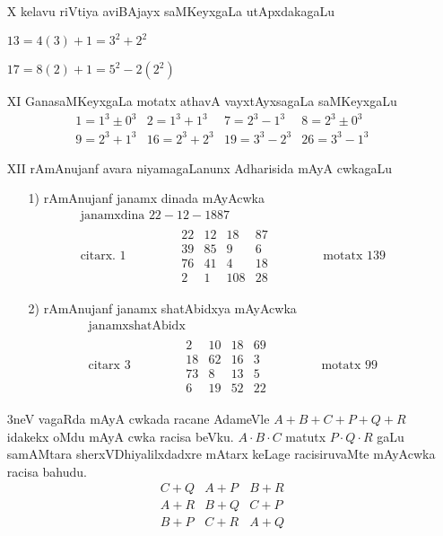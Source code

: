 \begin{enumerate}
\item[{\rm X}] kelavu riVtiya aviBAjayx saMKeyxgaLa utApxdakagaLu

$13=4(3)+1 = 3^{2}+2^{2}$

$17=8(2)+1 = 5^{2}-2(2^{2})$

\item[{\rm XI}] GanasaMKeyxgaLa motatx athavA vayxtAyxsagaLa saMKeyxgaLu
$$
\begin{matrix}
1=1^3\pm 0^3 & 2=1^3+1^3 & 7= 2^3-1^3 & 8= 2^3\pm 0^3\\
9=2^3+1^3 & 16=2^3+2^3 & 19=3^3-2^3 & 26=3^3-1^3 
\end{matrix}
$$
\item[{\rm XII}] rAmAnujanf avara niyamagaLanunx Adharisida mAyA cwkagaLu
\begin{itemize}
\item[{\rm 1)}] rAmAnujanf janamx dinada mAyAcwka
\begin{gather*}
\text{janamxdina } 22-12-1887\\
\text{citarx. }  1 \qquad \qquad 
\begin{matrix}
22 & 12 & 18 & 87\\
39 & 85 & 9 & 6\\
76 & 41 & 4 & 18\\
2 & 1 & 108 & 28
\end{matrix} \qquad \qquad
\text{motatx } 139
\end{gather*}

\item[{\rm 2)}] rAmAnujanf janamx shatAbidxya mAyAcwka
\begin{gather*}
\text{janamxshatAbidx }\\
\text{citarx } 3 \qquad \qquad 
\begin{matrix}
2 & 10 & 18 & 69\\
18 & 62 & 16 & 3\\
73 & 8 & 13 & 5\\
6 & 19 & 52 & 22
\end{matrix} \qquad \qquad 
\text{motatx } 99
\end{gather*}
\end{itemize}

{\rm 3}neV vagaRda mAyA cwkada racane AdameVle $A+B+C+P+Q+R$ idakekx oMdu mAyA cwka racisa beVku. $A\cdot B\cdot C$ matutx $P\cdot Q\cdot R$ gaLu samAMtara sherxVDhiyalilxdadxre mAtarx keLage racisiruvaMte mAyAcwka racisa bahudu.
$$
\begin{matrix}
C+Q & A+P & B+R\\
A+R & B+Q & C+P\\
B+P & C+R & A+Q
\end{matrix}
$$
 

\end{enumerate}
